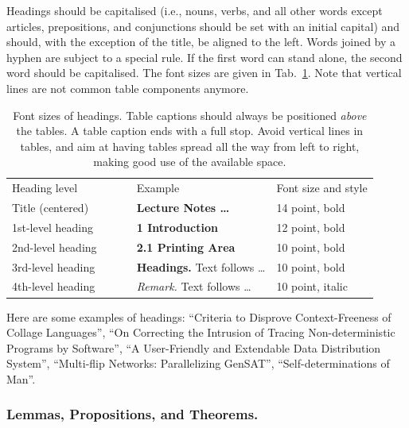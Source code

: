 \documentclass[runningheads]{llncs}
\begin{document}
Headings should be capitalised
(i.e., nouns, verbs, and all other words
except articles, prepositions, and conjunctions should be set with an
initial capital) and should,
with the exception of the title, be aligned to the left.
Words joined by a hyphen are subject to a special rule. If the first
word can stand alone, the second word should be capitalised.
The font sizes
are given in Tab.~\ref{table:headings}. Note that vertical lines
are not common table components anymore.
%
\setlength{\tabcolsep}{4pt}
\begin{table}
\begin{center}
\caption{
Font sizes of headings. Table captions should always be
positioned {\it above} the tables. A table
caption ends with a full stop. Avoid vertical lines in tables, and aim at
having tables spread all the way from left to right, making good use
of the available space.
}
\label{table:headings}
\begin{tabular}{lll}
\hline\noalign{\smallskip}
Heading level $\qquad\qquad$& Example & Font size and style\\
\noalign{\smallskip}
\hline
\noalign{\smallskip}
Title (centered)  & {\Large \bf Lecture Notes \dots} $\qquad$& 14 point, bold\\
1st-level heading & {\large \bf 1 Introduction} & 12 point, bold\\
2nd-level heading & {\bf 2.1 Printing Area} & 10 point, bold\\
3rd-level heading & {\bf Headings.} Text follows \dots & 10 point, bold
\\
4th-level heading & {\it Remark.} Text follows \dots & 10 point,
italic\\
\hline
\end{tabular}
\end{center}
\end{table}
\setlength{\tabcolsep}{1.4pt}

Here are
some examples of headings: ``Criteria to Disprove Context-Freeness of
Collage Languages'', ``On Correcting the Intrusion of Tracing
Non-deterministic Programs by Software'', ``A User-Friendly and
Extendable Data Distribution System'', ``Multi-flip Networks:
Parallelizing GenSAT'', ``Self-determinations of Man''.

\subsubsection{Lemmas, Propositions, and Theorems.}
\end{document}
